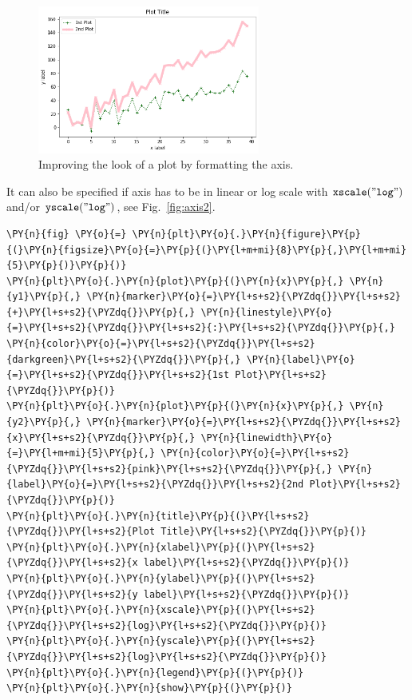 \begin{figure}[htb]
	\centering
	\includegraphics[width=0.65\textwidth]{figures/axis1}
	\caption{Improving the look of a plot by formatting the axis.}
	\label{fig:axis1}
\end{figure}

It can also be specified if axis has to be in linear or log scale with
\(\tt{xscale("log")}\) and/or \(\tt{yscale("log")}\), see Fig.~\ref{fig:axis2}.

\begin{tcolorbox}[breakable, size=fbox, boxrule=1pt, pad at break*=1mm,colback=cellbackground, colframe=cellborder]
\begin{Verbatim}[commandchars=\\\{\}]
\PY{n}{fig} \PY{o}{=} \PY{n}{plt}\PY{o}{.}\PY{n}{figure}\PY{p}{(}\PY{n}{figsize}\PY{o}{=}\PY{p}{(}\PY{l+m+mi}{8}\PY{p}{,}\PY{l+m+mi}{5}\PY{p}{)}\PY{p}{)}
\PY{n}{plt}\PY{o}{.}\PY{n}{plot}\PY{p}{(}\PY{n}{x}\PY{p}{,} \PY{n}{y1}\PY{p}{,} \PY{n}{marker}\PY{o}{=}\PY{l+s+s2}{\PYZdq{}}\PY{l+s+s2}{+}\PY{l+s+s2}{\PYZdq{}}\PY{p}{,} \PY{n}{linestyle}\PY{o}{=}\PY{l+s+s2}{\PYZdq{}}\PY{l+s+s2}{:}\PY{l+s+s2}{\PYZdq{}}\PY{p}{,} \PY{n}{color}\PY{o}{=}\PY{l+s+s2}{\PYZdq{}}\PY{l+s+s2}{darkgreen}\PY{l+s+s2}{\PYZdq{}}\PY{p}{,} \PY{n}{label}\PY{o}{=}\PY{l+s+s2}{\PYZdq{}}\PY{l+s+s2}{1st Plot}\PY{l+s+s2}{\PYZdq{}}\PY{p}{)}
\PY{n}{plt}\PY{o}{.}\PY{n}{plot}\PY{p}{(}\PY{n}{x}\PY{p}{,} \PY{n}{y2}\PY{p}{,} \PY{n}{marker}\PY{o}{=}\PY{l+s+s2}{\PYZdq{}}\PY{l+s+s2}{x}\PY{l+s+s2}{\PYZdq{}}\PY{p}{,} \PY{n}{linewidth}\PY{o}{=}\PY{l+m+mi}{5}\PY{p}{,} \PY{n}{color}\PY{o}{=}\PY{l+s+s2}{\PYZdq{}}\PY{l+s+s2}{pink}\PY{l+s+s2}{\PYZdq{}}\PY{p}{,} \PY{n}{label}\PY{o}{=}\PY{l+s+s2}{\PYZdq{}}\PY{l+s+s2}{2nd Plot}\PY{l+s+s2}{\PYZdq{}}\PY{p}{)}
\PY{n}{plt}\PY{o}{.}\PY{n}{title}\PY{p}{(}\PY{l+s+s2}{\PYZdq{}}\PY{l+s+s2}{Plot Title}\PY{l+s+s2}{\PYZdq{}}\PY{p}{)}
\PY{n}{plt}\PY{o}{.}\PY{n}{xlabel}\PY{p}{(}\PY{l+s+s2}{\PYZdq{}}\PY{l+s+s2}{x label}\PY{l+s+s2}{\PYZdq{}}\PY{p}{)}
\PY{n}{plt}\PY{o}{.}\PY{n}{ylabel}\PY{p}{(}\PY{l+s+s2}{\PYZdq{}}\PY{l+s+s2}{y label}\PY{l+s+s2}{\PYZdq{}}\PY{p}{)}
\PY{n}{plt}\PY{o}{.}\PY{n}{xscale}\PY{p}{(}\PY{l+s+s2}{\PYZdq{}}\PY{l+s+s2}{log}\PY{l+s+s2}{\PYZdq{}}\PY{p}{)}
\PY{n}{plt}\PY{o}{.}\PY{n}{yscale}\PY{p}{(}\PY{l+s+s2}{\PYZdq{}}\PY{l+s+s2}{log}\PY{l+s+s2}{\PYZdq{}}\PY{p}{)}
\PY{n}{plt}\PY{o}{.}\PY{n}{legend}\PY{p}{(}\PY{p}{)}
\PY{n}{plt}\PY{o}{.}\PY{n}{show}\PY{p}{(}\PY{p}{)}
\end{Verbatim}
\end{tcolorbox}

